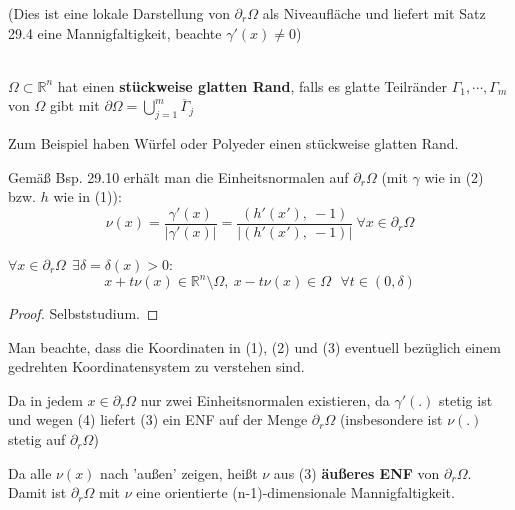 (Dies ist eine lokale Darstellung von $\partial_r \Omega $ als Niveaufläche
und liefert mit Satz 29.4 eine Mannigfaltigkeit, beachte $\gamma'(x) \neq 0 $)

\begin{definition}
    \mbox{} \\
    $\Omega \subset \mathbb{R}^n $ hat einen \textbf{stückweise glatten Rand}, 
    falls es glatte Teilränder $\Gamma_1, \cdots, \Gamma_m $ von $\Omega$ gibt mit
    $\partial \Omega = \bigcup\limits_{j=1}^m \overline{\Gamma}_j $
\end{definition}

Zum Beispiel haben Würfel oder Polyeder einen stückweise glatten Rand.

Gemäß Bsp. 29.10 erhält man die Einheitsnormalen auf $\partial_r \Omega $
(mit $\gamma$ wie in (2) bzw. $h$ wie in (1)): \\

\begin{equation}
    \nu(x) = 
    \frac{\gamma'(x)}{|\gamma'(x)|} = 
    \frac{(h'(x'),\ -1)}{|(h'(x'),\ -1)|} \
    \forall x \in \partial_r \Omega
\end{equation}

\begin{lemma}
$\forall x \in \partial_r \Omega \ \ \exists \delta = \delta(x) > 0$:
\begin{equation}
    x + t \nu(x) \in \mathbb{R}^n \setminus \Omega, \ x - t \nu(x) \in \Omega \ \ \
    \forall t \in (0, \delta)
\end{equation}
\end{lemma}

\begin{proof}
    Selbststudium.
\end{proof}

Man beachte, dass die Koordinaten in (1), (2) und (3) eventuell bezüglich einem
gedrehten Koordinatensystem zu verstehen sind.

Da in jedem $x \in \partial_r \Omega $ nur zwei Einheitsnormalen existieren, da
$\gamma'(.) $ stetig ist und wegen (4) liefert (3) ein ENF auf der Menge
$\partial_r \Omega $ (insbesondere ist $\nu(.) $ stetig auf $\partial_r \Omega $)

Da alle $\nu(x) $ nach 'außen' zeigen, heißt $\nu$ aus (3) \textbf{äußeres ENF} von
$\partial_r \Omega $.\\
Damit ist $\partial_r \Omega $ mit $\nu$ eine orientierte (n-1)-dimensionale
Mannigfaltigkeit.

